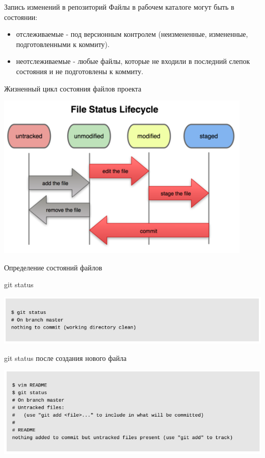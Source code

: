 \documentclass{beamer}
\begin{document}
\begin{frame}{Запись изменений в репозиторий}
Файлы в рабочем каталоге могут быть в состоянии:
\begin{itemize}
\item отслеживаемые - под версионным контролем (неизмененные, измененные, подготовленными к коммиту).
\item неотслеживаемые - любые файлы, которые не входили в последний слепок состояния и не подготовлены к коммиту. 
\end{itemize}
\begin{block}{Жизненный цикл состояния файлов проекта}
\begin{center}
\includegraphics[scale=0.5]{images/lifecycle.png}
\end{center}
\end{block}
\end{frame}

\begin{frame}{Определение состояний файлов}
\begin{block}{git status}
\begin{center}
\includegraphics[scale=0.5]{images/git-status-1.png}
\end{center}
\end{block}
\begin{block}{git status после создания нового файла}
\begin{center}
\includegraphics[scale=0.5]{images/git-status-2.png}
\end{center}
\end{block}
\end{frame}
\end{document}
